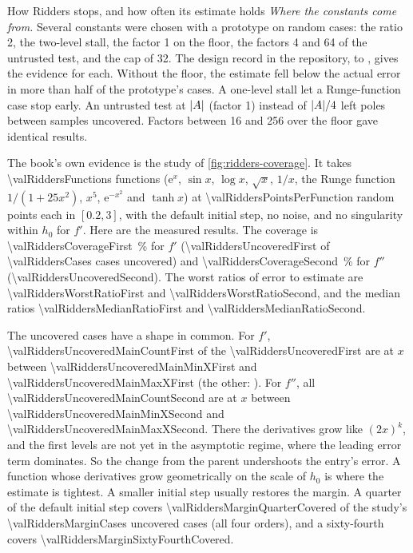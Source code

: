 \begin{sidebar}[label=sb:floor-coverage]{How Ridders stops, and how often its estimate holds}
\emph{Where the constants come from.} Several constants were chosen with a prototype on random cases: the ratio 2,
the two-level stall, the factor 1 on the floor, the factors 4 and 64 of the untrusted test, and the cap of 32. The
design record in the repository,  to , gives the
evidence for each. Without the floor, the estimate fell below the actual error in more than half of the prototype's
cases. A one-level stall let a Runge-function case stop early. An untrusted test at $\lvert A \rvert$ (factor 1) instead of
$\lvert A \rvert / 4$ left poles between samples uncovered. Factors between 16 and 256 over the floor gave identical results.

The book's own evidence is the study of \cref{fig:ridders-coverage}. It takes \num{\valRiddersFunctions} functions
($\mathrm{e}^x$, $\sin x$, $\log x$, $\sqrt{x}$, $1/x$, the Runge function $1/(1 + 25x^2)$, $x^5$,
$\mathrm{e}^{-x^2}$ and $\tanh x$) at \num{\valRiddersPointsPerFunction} random points each in $[0.2, 3]$, with the
default initial step, no noise, and no singularity within $h_0$ for $f'$. Here are the measured results. The
coverage is \SI{\valRiddersCoverageFirst}{\percent} for $f'$ (\num{\valRiddersUncoveredFirst} of
\num{\valRiddersCases} cases uncovered) and \SI{\valRiddersCoverageSecond}{\percent} for $f''$
(\num{\valRiddersUncoveredSecond}). The worst ratios of error to estimate are \num{\valRiddersWorstRatioFirst} and
\num{\valRiddersWorstRatioSecond}, and the median ratios \num{\valRiddersMedianRatioFirst} and
\num{\valRiddersMedianRatioSecond}.

The uncovered cases have a shape in common. For $f'$, \num{\valRiddersUncoveredMainCountFirst} of the
\num{\valRiddersUncoveredFirst} are \valRiddersUncoveredMainFunctionFirst{} at $x$ between
\num{\valRiddersUncoveredMainMinXFirst} and \num{\valRiddersUncoveredMainMaxXFirst} (the other:
\valRiddersUncoveredOthersFirst). For $f''$, all \num{\valRiddersUncoveredMainCountSecond} are
\valRiddersUncoveredMainFunctionSecond{} at $x$ between \num{\valRiddersUncoveredMainMinXSecond} and
\num{\valRiddersUncoveredMainMaxXSecond}. There the derivatives grow like $(2x)^k$, and the first levels are not yet
in the asymptotic regime, where the leading error term dominates. So the change from the parent undershoots the
entry's error. A function whose derivatives grow geometrically on the scale of $h_0$ is where the estimate is
tightest. A smaller initial step usually restores the margin. A quarter of the default initial step covers
\num{\valRiddersMarginQuarterCovered} of the study's \num{\valRiddersMarginCases} uncovered cases (all four orders),
and a sixty-fourth covers \num{\valRiddersMarginSixtyFourthCovered}.


\end{sidebar}

